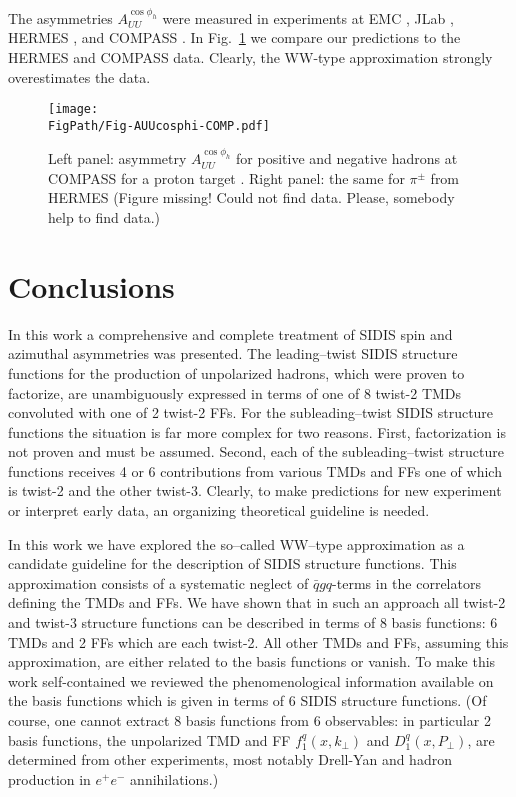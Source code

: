 \documentclass[a4paper,11pt]{article}
\newcommand{\red}[1]{{\color{red} #1}}
\def\kperp{k_\perp}
\def\pperp{P_\perp}
\newcommand*{\FigPath}{./figs}%
\begin{document}
The asymmetries $A_{UU}^{\cos\phi_h}$ were measured in experiments at
EMC \cite{Aubert:1983cz}, JLab \cite{Osipenko:2008aa,Mkrtchyan:2007sr}, 
HERMES \cite{Airapetian:2012yg}, and COMPASS \cite{Adolph:2014pwc}.
In Fig.~\ref{auucosphi_jlab} we compare our predictions 
to the HERMES and COMPASS data. Clearly, the WW-type
approximation strongly overestimates the data.


\begin{figure}[ht]
\centering
\texttt{[image: \\FigPath/Fig-AUUcosphi-COMP.pdf]} 
\caption{\label{auucosphi_jlab} 
	Left panel: asymmetry $A_{UU}^{\cos\phi_h}$ for positive and negative 
	hadrons at COMPASS for a proton target \cite{Adolph:2014pwc}.
	Right panel: the same for $\pi^\pm$ from HERMES \cite{Airapetian:2012yg}
	\red{(Figure missing! Could not find data. Please, somebody
	help to find data.)}}
\end{figure}


{}

\newpage
\section{Conclusions}
\label{Sec-8:conclusions}

In this work a comprehensive and complete treatment of SIDIS
spin and azimuthal asymmetries was presented. The leading--twist
SIDIS structure functions for the production of unpolarized hadrons,
which were proven to factorize, are unambiguously expressed in terms 
of one of 8 twist-2 TMDs convoluted with one of 2 twist-2 FFs.
For the subleading--twist SIDIS structure functions the situation
is far more complex for two reasons. First, factorization is not 
proven and must be assumed. 
Second, each of the subleading--twist structure functions
receives 4 or 6 contributions from various TMDs and FFs one of
which is twist-2 and the other twist-3. Clearly, to make 
predictions for new experiment or interpret early data, an
organizing theoretical guideline is needed.

In this work we have explored the so--called WW--type approximation
as a candidate guideline for the description of SIDIS structure
functions. This approximation consists of a systematic neglect 
of $\bar qgq$-terms in the
correlators defining the TMDs and FFs. We have shown that in such
an approach all twist-2 and twist-3 structure functions can be
described in terms of 8 basis functions: 6 TMDs and 2 FFs
which are each twist-2. All other TMDs and FFs, assuming this
approximation, are either related to the basis functions or
vanish. To make this work self-contained
we reviewed the phenomenological information available
on the basis functions which is given in terms of 6 SIDIS
structure functions. (Of course, one cannot extract 8 basis
functions from 6 observables: in particular 2 basis functions,
the unpolarized TMD and FF $f_1^q(x,\kperp)$ and $D_1^q(x,\pperp)$,
are determined from other experiments, most notably Drell-Yan
and hadron production in $e^+e^-$ annihilations.)
\end{document}
